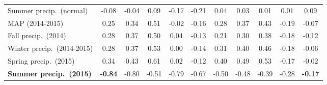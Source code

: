 \documentclass{article}
\begin{document}
\begin{landscape}
\begin{longtable}[p]{lcccccccccc}
Summer precip.\ (normal)        & -0.08          & -0.04     & 0.09      & -0.17     & -0.21     & 0.04    & 0.03     & 0.01     & 0.01     & 0.09     \\
MAP (2014-2015)                & 0.25           & 0.34      & 0.51      & -0.02     & -0.16     & 0.28    & 0.37     & 0.43     & -0.19    & -0.07    \\
Fall precip.\ (2014)            & 0.28           & 0.37      & 0.50      & 0.04      & -0.13     & 0.21    & 0.30     & 0.38     & -0.18    & -0.12    \\
Winter precip.\ (2014-2015)     & 0.28           & 0.37      & 0.53      & 0.00      & -0.14     & 0.31    & 0.40     & 0.46     & -0.18    & -0.06    \\
Spring precip.\ (2015)          & 0.34           & 0.43      & 0.61      & 0.02      & -0.12     & 0.40    & 0.49     & 0.53     & -0.17    & -0.02    \\
\textbf{Summer precip.\ (2015)} & \textbf{-0.84} & -0.80     & -0.51     & -0.79     & -0.67     & -0.50   & -0.48    & -0.39    & -0.28    & \textbf{-0.17}   \\
\bottomrule
\end{longtable}
\end{landscape}
\end{document}
